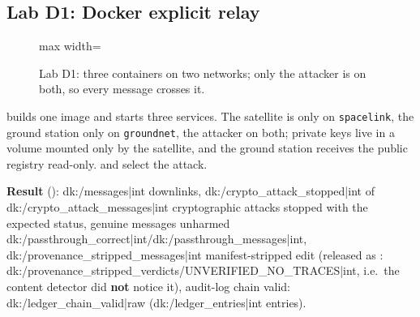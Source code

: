 \subsection{Lab D1: Docker explicit relay}
\begin{figure}[!htbp]
\centering
\begin{adjustbox}{max width=\textwidth}
\end{adjustbox}
\caption{Lab D1: three containers on two networks; only the attacker is on both, so every message crosses it.}
\end{figure}
 builds one image and starts three services. The satellite is only on \texttt{spacelink}, the ground station only on \texttt{groundnet}, the attacker on both; private keys live in a volume mounted only by the satellite, and the ground station receives the public registry read-only.  and  select the attack.

\textbf{Result} (): {{dk:/messages|int}} downlinks, {{dk:/crypto_attack_stopped|int}} of {{dk:/crypto_attack_messages|int}} cryptographic attacks stopped with the expected status, genuine messages unharmed {{dk:/passthrough_correct|int}}/{{dk:/passthrough_messages|int}}, {{dk:/provenance_stripped_messages|int}} manifest-stripped edit (released as : {{dk:/provenance_stripped_verdicts/UNVERIFIED_NO_TRACES|int}}, i.e.\ the content detector did \textbf{not} notice it), audit-log chain valid: {{dk:/ledger_chain_valid|raw}} ({{dk:/ledger_entries|int}} entries).

